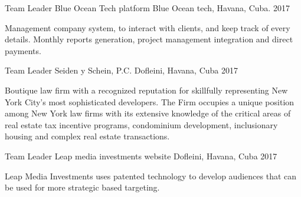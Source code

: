 


\begin{cventries}


\cventry
{Team Leader} %
{Blue Ocean Tech platform} %
{Blue Ocean tech, Havana, Cuba.} %
{2017} %
{ %
\begin{cvitems}
\item {Management company system, to interact with clients, and keep track of every details. Monthly reports generation, project management integration and direct payments.}
\end{cvitems}
}


\cventry
{Team Leader} %
{Seiden y Schein, P.C.} %
{Dofleini, Havana, Cuba} %
{2017} %
{ %
\begin{cvitems}
\item {Boutique law firm with a recognized reputation for skillfully representing New York City’s most sophisticated developers. The Firm occupies a unique position among New York law firms with its extensive knowledge of the critical areas of real estate tax incentive programs, condominium development, inclusionary housing and complex real estate transactions.}
\end{cvitems}
}



\cventry
{Team Leader} %
{Leap media investments website} %
{Dofleini, Havana, Cuba} %
{2017} %
{ %
\begin{cvitems}
\item {Leap Media Investments uses patented technology to develop audiences that can be used for more strategic based targeting.}
\end{cvitems}
}


\end{cventries}
